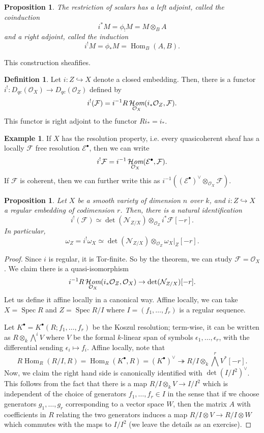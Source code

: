 \documentclass[10pt]{article}
\newtheorem{prop}[thm]{Proposition}
\theoremstyle{definition}
\newtheorem{exmp}[thm]{Example}
\newtheorem{defn}[thm]{Definition}
\DeclareMathOperator{\Hom}{Hom}
\DeclareMathOperator{\Spec}{Spec}
\DeclareMathOperator{\shHom}{\mathcal{H}\emph{om}}
\newcommand{\OO}{\mathcal{O}}
\begin{document}
\begin{prop}
The restriction of scalars has a left adjoint, called the coinduction
$$i^* M = \phi_! M = M \otimes_B A$$
and a right adjoint, called the induction
$$i^! M = \phi_* M = \Hom_B(A, B).$$
\end{prop}

This construction sheafifies.
\begin{defn}
Let $i: Z \hookrightarrow X$ denote a closed embedding.  Then, there is a functor $i^!: D_{qc}(\OO_X) \rightarrow D_{qc}(\OO_Z)$ defined by
$$i^!(\mathcal{F}) = i^{-1}R\shHom_{\OO_X}(i_* \OO_Z, \mathcal{F}).$$
This functor is right adjoint to the functor $Ri_* = i_*$.
\end{defn}

\begin{exmp}
If $X$ has the resolution property, i.e. every quasicoherent sheaf has a locally $\mathcal{F}$ free resolution $\mathcal{E}^\bullet$, then we can write
$$i^! \mathcal{F} = i^{-1} \shHom_{\OO_X}(\mathcal{E}^\bullet, \mathcal{F}).$$
If $\mathcal{F}$ is coherent, then we can further write this as $i^{-1}((\mathcal{E}^\bullet)^\vee \otimes_{\OO_X} \mathcal{F})$.
\end{exmp}


\begin{prop}
Let $X$ be a smooth variety of dimension $n$ over $k$, and $i: Z \hookrightarrow X$ a regular embedding of codimension $r$.  Then, there is a natural identification
$$i^!(\mathcal{F}) \simeq \det(\mathcal{N}_{Z/X}) \otimes_{\OO_Z} i^* \mathcal{F}[-r].$$
In particular, 
$$\omega_Z = i^! \omega_X \simeq \det(\mathcal{N}_{Z/X}) \otimes_{\OO_Z} \omega_X|_Z[-r].$$
\end{prop}
\begin{proof}
Since $i$ is regular, it is Tor-finite.  So by the theorem, we can study $\mathcal{F} = \OO_X$.  We claim there is a quasi-isomorphism
$$i^{-1}R\shHom_{\OO_X}(i_*\OO_Z, \OO_X) \rightarrow \det(\mathcal{N}_{Z/X})[-r].$$
Let us define it affine locally in a canonical way.  Affine locally, we can take $X = \Spec R$ and $Z = \Spec R/I$ where $I = (f_1, \ldots, f_r)$ is a regular sequence.  

Let $K^\bullet = K^\bullet(R; f_1, \ldots, f_r)$ be the Koszul resolution; term-wise, it can be written as $R \otimes_k \bigwedge^i V$ where $V$ be the formal $k$-linear span of symbols $\epsilon_1, \ldots, \epsilon_r$, with the differential sending $\epsilon_i \mapsto f_i$.  Affine locally, note that
$$R\Hom_R(R/I, R) = \Hom_R(K^\bullet, R) = (K^\bullet)^\vee \twoheadrightarrow R/I \otimes_k \bigwedge^r V^*[-r].$$
Now, we claim the right hand side is canonically identified with $\det(I/I^2)^\vee$.  This follows from the fact that there is a map $R/I \otimes_k V \rightarrow I/I^2$ which is independent of the choice of generators $f_1, \ldots, f_r \in I$ in the sense that if we choose generators $g_1, \ldots, g_r$ corresponding to a vector space $W$, then the matrix $A$ with coefficients in $R$ relating the two generators induces a map $R/I \otimes V \rightarrow R/I \otimes W$ which commutes with the maps to $I/I^2$ (we leave the details as an exercise).
\end{proof}
\end{document}
